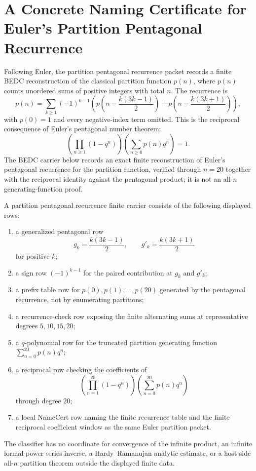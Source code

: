 \chapter{A Concrete Naming Certificate for Euler's Partition Pentagonal Recurrence}
\label{ch:concrete-instances-partition-pentagonal-recurrence-namecert}

Following Euler, the partition pentagonal recurrence packet records a finite BEDC reconstruction of the classical partition function $p(n)$, where $p(n)$ counts unordered sums of positive integers with total $n$. The recurrence is
$$
p(n)=\sum_{k\geq 1}(-1)^{k-1}\left(p\left(n-\frac{k(3k-1)}{2}\right)+p\left(n-\frac{k(3k+1)}{2}\right)\right),
$$
with $p(0)=1$ and every negative-index term omitted. This is the reciprocal consequence of Euler's pentagonal number theorem:
$$
\left(\prod_{n\geq 1}(1-q^n)\right)\left(\sum_{n\geq 0}p(n)q^n\right)=1.
$$
The BEDC carrier below records an exact finite reconstruction of Euler's pentagonal recurrence for the partition function, verified through $n=20$ together with the reciprocal identity against the pentagonal product; it is not an all-$n$ generating-function proof.

\begin{definition}
\label{def:partition-pentagonal-recurrence-finite-carrier}
A partition pentagonal recurrence finite carrier consists of the following displayed rows:
\begin{enumerate}
\item a generalized pentagonal row
$$
g_k=\frac{k(3k-1)}{2},\qquad g'_k=\frac{k(3k+1)}{2}
$$
for positive $k$;
\item a sign row $(-1)^{k-1}$ for the paired contribution at $g_k$ and $g'_k$;
\item a prefix table row for $p(0),p(1),\ldots,p(20)$ generated by the pentagonal recurrence, not by enumerating partitions;
\item a recurrence-check row exposing the finite alternating sums at representative degrees $5,10,15,20$;
\item a $q$-polynomial row for the truncated partition generating function $\sum_{n=0}^{20}p(n)q^n$;
\item a reciprocal row checking the coefficients of
$$
\left(\prod_{n=1}^{20}(1-q^n)\right)\left(\sum_{n=0}^{20}p(n)q^n\right)
$$
through degree $20$;
\item a local NameCert row naming the finite recurrence table and the finite reciprocal coefficient window as the same Euler partition packet.
\end{enumerate}
The classifier has no coordinate for convergence of the infinite product, an infinite formal-power-series inverse, a Hardy--Ramanujan analytic estimate, or a host-side all-$n$ partition theorem outside the displayed finite data.
\end{definition}

